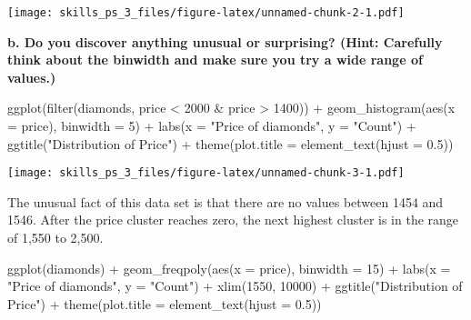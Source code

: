 \documentclass[
]{article}
\newenvironment{Shaded}{\begin{snugshade}}{\end{snugshade}}
\newcommand{\AttributeTok}[1]{\textcolor[rgb]{0.77,0.63,0.00}{#1}}
\newcommand{\DecValTok}[1]{\textcolor[rgb]{0.00,0.00,0.81}{#1}}
\newcommand{\FloatTok}[1]{\textcolor[rgb]{0.00,0.00,0.81}{#1}}
\newcommand{\FunctionTok}[1]{\textcolor[rgb]{0.00,0.00,0.00}{#1}}
\newcommand{\NormalTok}[1]{#1}
\newcommand{\SpecialCharTok}[1]{\textcolor[rgb]{0.00,0.00,0.00}{#1}}
\newcommand{\StringTok}[1]{\textcolor[rgb]{0.31,0.60,0.02}{#1}}
\begin{document}
\texttt{[image: skills\_ps\_3\_files/figure-latex/unnamed-chunk-2-1.pdf]}

\textbf{b. Do you discover anything unusual or surprising? (Hint:
Carefully think about the binwidth and make sure you try a wide range of
values.)}

\begin{Shaded}
\begin{Highlighting}[]
\FunctionTok{ggplot}\NormalTok{(}\FunctionTok{filter}\NormalTok{(diamonds, price }\SpecialCharTok{\textless{}} \DecValTok{2000} \SpecialCharTok{\&}\NormalTok{ price }\SpecialCharTok{\textgreater{}} \DecValTok{1400}\NormalTok{)) }\SpecialCharTok{+} 
  \FunctionTok{geom\_histogram}\NormalTok{(}\FunctionTok{aes}\NormalTok{(}\AttributeTok{x =}\NormalTok{ price), }\AttributeTok{binwidth =} \DecValTok{5}\NormalTok{) }\SpecialCharTok{+}
  \FunctionTok{labs}\NormalTok{(}\AttributeTok{x =} \StringTok{"Price of diamonds"}\NormalTok{, }\AttributeTok{y =} \StringTok{"Count"}\NormalTok{) }\SpecialCharTok{+}
  \FunctionTok{ggtitle}\NormalTok{(}\StringTok{"Distribution of Price"}\NormalTok{) }\SpecialCharTok{+}
  \FunctionTok{theme}\NormalTok{(}\AttributeTok{plot.title =} \FunctionTok{element\_text}\NormalTok{(}\AttributeTok{hjust =} \FloatTok{0.5}\NormalTok{))}
\end{Highlighting}
\end{Shaded}

\texttt{[image: skills\_ps\_3\_files/figure-latex/unnamed-chunk-3-1.pdf]}

The unusual fact of this data set is that there are no values between
1454 and 1546. After the price cluster reaches zero, the next highest
cluster is in the range of 1,550 to 2,500.

\begin{Shaded}
\begin{Highlighting}[]
\FunctionTok{ggplot}\NormalTok{(diamonds) }\SpecialCharTok{+} 
  \FunctionTok{geom\_freqpoly}\NormalTok{(}\FunctionTok{aes}\NormalTok{(}\AttributeTok{x =}\NormalTok{ price), }\AttributeTok{binwidth =} \DecValTok{15}\NormalTok{) }\SpecialCharTok{+}
  \FunctionTok{labs}\NormalTok{(}\AttributeTok{x =} \StringTok{"Price of diamonds"}\NormalTok{, }\AttributeTok{y =} \StringTok{"Count"}\NormalTok{) }\SpecialCharTok{+}
  \FunctionTok{xlim}\NormalTok{(}\DecValTok{1550}\NormalTok{, }\DecValTok{10000}\NormalTok{) }\SpecialCharTok{+}
  \FunctionTok{ggtitle}\NormalTok{(}\StringTok{"Distribution of Price"}\NormalTok{) }\SpecialCharTok{+}
  \FunctionTok{theme}\NormalTok{(}\AttributeTok{plot.title =} \FunctionTok{element\_text}\NormalTok{(}\AttributeTok{hjust =} \FloatTok{0.5}\NormalTok{))}
\end{Highlighting}
\end{Shaded}
\end{document}
